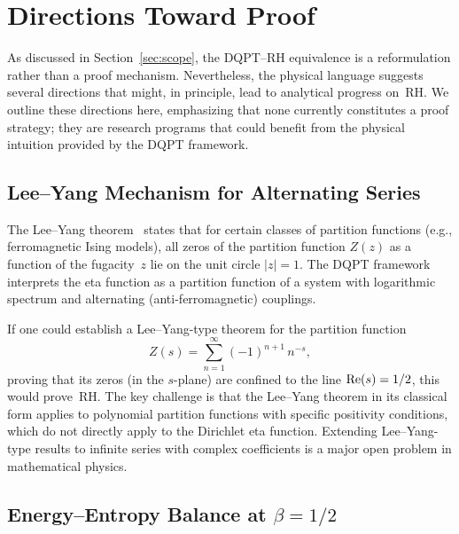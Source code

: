\section{Directions Toward Proof}
\label{sec:directions}

As discussed in Section~\ref{sec:scope}, the DQPT--RH equivalence is a reformulation
rather than a proof mechanism. Nevertheless, the physical language suggests several
directions that might, in principle, lead to analytical progress on~RH. We outline these
directions here, emphasizing that none currently constitutes a proof strategy; they are
research programs that could benefit from the physical intuition provided by the DQPT
framework.


\subsection{Lee--Yang Mechanism for Alternating Series}
\label{sec:lee-yang-mech}

The Lee--Yang theorem~\cite{leeyang1952} states that for certain classes of partition
functions (e.g., ferromagnetic Ising models), all zeros of the partition function $Z(z)$
as a function of the fugacity~$z$ lie on the unit circle $|z| = 1$. The DQPT framework
interprets the eta function as a partition function of a system with logarithmic spectrum
and alternating (anti-ferromagnetic) couplings.

If one could establish a Lee--Yang-type theorem for the partition function
\begin{equation}\label{eq:ly-eta}
  Z(s) = \sum_{n=1}^{\infty} (-1)^{n+1}\,n^{-s},
\end{equation}
proving that its zeros (in the $s$-plane) are confined to the line $\operatorname{Re}(s) = 1/2$, this
would prove~RH. The key challenge is that the Lee--Yang theorem in its classical form
applies to polynomial partition functions with specific positivity conditions, which do
not directly apply to the Dirichlet eta function. Extending Lee--Yang-type results to
infinite series with complex coefficients is a major open problem in mathematical
physics.


\subsection{Energy--Entropy Balance at $\beta = 1/2$}
\label{sec:energy-entropy}

